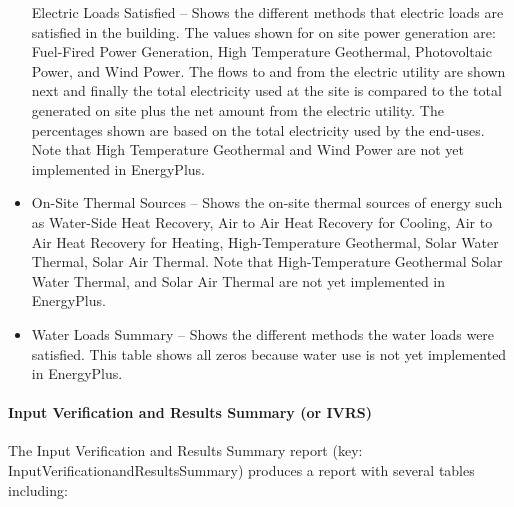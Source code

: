 \begin{itemize}
  Electric Loads Satisfied -- Shows the different methods that electric loads are satisfied in the building. The values shown for on site power generation are: Fuel-Fired Power Generation, High Temperature Geothermal, Photovoltaic Power, and Wind Power. The flows to and from the electric utility are shown next and finally the total electricity used at the site is compared to the total generated on site plus the net amount from the electric utility. The percentages shown are based on the total electricity used by the end-uses. Note that High Temperature Geothermal and Wind Power are not yet implemented in EnergyPlus.
\item
  On-Site Thermal Sources -- Shows the on-site thermal sources of energy such as Water-Side Heat Recovery, Air to Air Heat Recovery for Cooling, Air to Air Heat Recovery for Heating, High-Temperature Geothermal, Solar Water Thermal, Solar Air Thermal. Note that High-Temperature Geothermal Solar Water Thermal, and Solar Air Thermal are not yet implemented in EnergyPlus.
\item
  Water Loads Summary -- Shows the different methods the water loads were satisfied. This table shows all zeros because water use is not yet implemented in EnergyPlus.
\end{itemize}

\paragraph{Input Verification and Results Summary (or IVRS)}\label{input-verification-and-results-summary-or-ivrs}

The Input Verification and Results Summary report (key: InputVerificationandResultsSummary) produces a report with several tables including:


